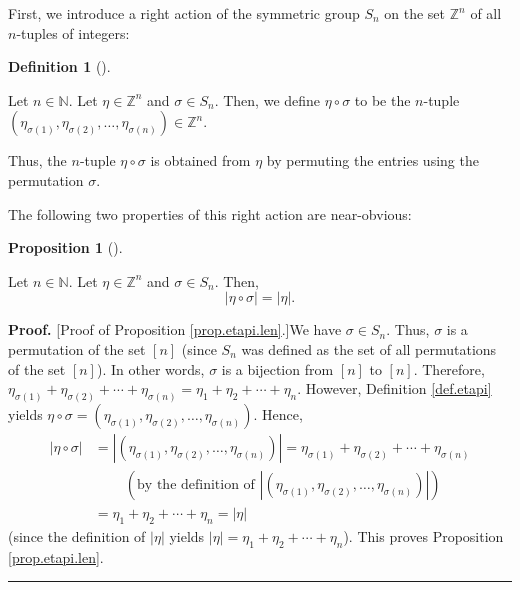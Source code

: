 \documentclass[numbers=enddot,12pt,final,onecolumn,notitlepage,english]{scrartcl}%
\theoremstyle{definition}
\newtheorem{prop}[theo]{Proposition}
\newenvironment{proposition}[1][]
{\begin{prop}[#1]\begin{leftbar}}
{\end{leftbar}\end{prop}}
\newtheorem{defi}[theo]{Definition}
\newenvironment{definition}[1][]
{\begin{defi}[#1]\begin{leftbar}}
{\end{leftbar}\end{defi}}
\newenvironment{proof}[1][Proof]{\noindent\textbf{#1.} }{\ \rule{0.5em}{0.5em}}
\newenvironment{verlong}{}{}
\begin{document}
First, we introduce a right action of the symmetric group $S_{n}$ on the set
$\mathbb{Z}^{n}$ of all $n$-tuples of integers:

\begin{definition}
\label{def.etapi}Let $n\in\mathbb{N}$. Let $\eta\in\mathbb{Z}^{n}$ and
$\sigma\in S_{n}$. Then, we define $\eta\circ\sigma$ to be the $n$-tuple
$\left(  \eta_{\sigma\left(  1\right)  },\eta_{\sigma\left(  2\right)
},\ldots,\eta_{\sigma\left(  n\right)  }\right)  \in\mathbb{Z}^{n}$.
\end{definition}

Thus, the $n$-tuple $\eta\circ\sigma$ is obtained from $\eta$ by permuting the
entries using the permutation $\sigma$.

The following two properties of this right action are near-obvious:

\begin{proposition}
\label{prop.etapi.len}Let $n\in\mathbb{N}$. Let $\eta\in\mathbb{Z}^{n}$ and
$\sigma\in S_{n}$. Then,
\[
\left\vert \eta\circ\sigma\right\vert =\left\vert \eta\right\vert .
\]

\end{proposition}

\begin{verlong}
\begin{proof}
[Proof of Proposition \ref{prop.etapi.len}.]We have $\sigma\in S_{n}$. Thus,
$\sigma$ is a permutation of the set $\left[  n\right]  $ (since $S_{n}$ was
defined as the set of all permutations of the set $\left[  n\right]  $). In
other words, $\sigma$ is a bijection from $\left[  n\right]  $ to $\left[
n\right]  $. Therefore, $\eta_{\sigma\left(  1\right)  }+\eta_{\sigma\left(
2\right)  }+\cdots+\eta_{\sigma\left(  n\right)  }=\eta_{1}+\eta_{2}%
+\cdots+\eta_{n}$. However, Definition \ref{def.etapi} yields $\eta\circ
\sigma=\left(  \eta_{\sigma\left(  1\right)  },\eta_{\sigma\left(  2\right)
},\ldots,\eta_{\sigma\left(  n\right)  }\right)  $. Hence,%
\begin{align*}
\left\vert \eta\circ\sigma\right\vert  &  =\left\vert \left(  \eta
_{\sigma\left(  1\right)  },\eta_{\sigma\left(  2\right)  },\ldots
,\eta_{\sigma\left(  n\right)  }\right)  \right\vert =\eta_{\sigma\left(
1\right)  }+\eta_{\sigma\left(  2\right)  }+\cdots+\eta_{\sigma\left(
n\right)  }\\
&  \ \ \ \ \ \ \ \ \ \ \left(  \text{by the definition of }\left\vert \left(
\eta_{\sigma\left(  1\right)  },\eta_{\sigma\left(  2\right)  },\ldots
,\eta_{\sigma\left(  n\right)  }\right)  \right\vert \right) \\
&  =\eta_{1}+\eta_{2}+\cdots+\eta_{n}=\left\vert \eta\right\vert
\end{align*}
(since the definition of $\left\vert \eta\right\vert $ yields $\left\vert
\eta\right\vert =\eta_{1}+\eta_{2}+\cdots+\eta_{n}$). This proves Proposition
\ref{prop.etapi.len}.
\end{proof}
\end{verlong}
\end{document}
